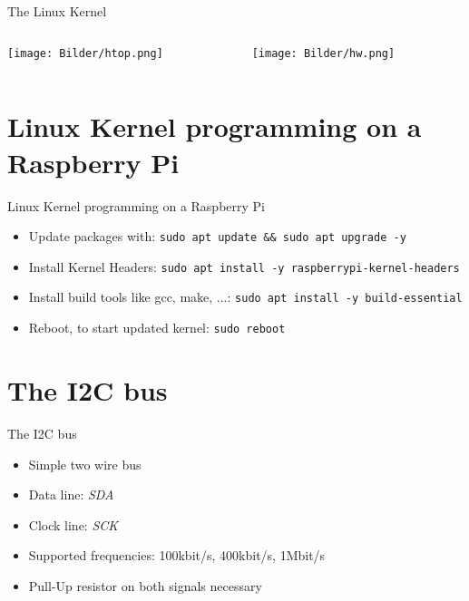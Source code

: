 \documentclass[aspectratio=169]{beamer}
\begin{document}
\begin{frame}{The Linux Kernel}
	\begin{columns}
		\begin{column}[T]{0.5\linewidth}
			\texttt{[image: Bilder/htop.png]}
		\end{column}
		\begin{column}[T]{0.5\linewidth}
			\texttt{[image: Bilder/hw.png]}
		\end{column}
	\end{columns}
\end{frame}

\section{Linux Kernel programming on a Raspberry Pi}
\begin{frame}[fragile]{Linux Kernel programming on a Raspberry Pi}
	\begin{itemize}
		\item Update packages with: \lstinline|sudo apt update && sudo apt upgrade -y|
		\item Install Kernel Headers: \lstinline|sudo apt install -y raspberrypi-kernel-headers|
		\item Install build tools like gcc, make, ...: \lstinline|sudo apt install -y build-essential|
		\item Reboot, to start updated kernel: \lstinline|sudo reboot|
	\end{itemize}
\end{frame}

\section{The I2C bus}

\begin{frame}{The I2C bus}
	\begin{itemize}
		\item Simple two wire bus
		\item Data line: \textit{SDA}
		\item Clock line: \textit{SCK} 
		\item Supported frequencies: 100kbit/s, 400kbit/s, 1Mbit/s
		\item Pull-Up resistor on both signals necessary
	\end{itemize}
\end{frame}
\end{document}
